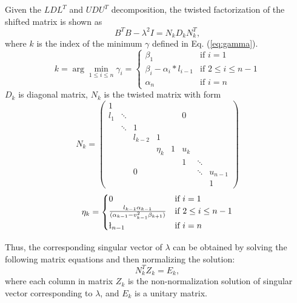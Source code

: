 Given the $LDL^T$ and $UDU^T$ decomposition, the twisted factorization of the shifted matrix is shown as
\begin{equation}
B^T B - \lambda^2 I = N_k D_k N_k^T ,
\label{eq:twisted}
\end{equation}
where $k$ is the index of the minimum $\gamma$ defined in Eq. (\ref{eq:gamma}).
\begin{equation}
\label{eq:gamma}
k = \arg \min_{1\le i \le n} \gamma_{i} =
\begin{cases}
\beta_1 & \text{if } i=1 \\
\beta_i - \alpha_i * l_{i-1} & \text{if } 2\le i\le n-1\\
\alpha_n & \text{if } i=n
\end{cases}
\end{equation}
$D_k$ is diagonal matrix, $N_k$ is the twisted matrix with form 
\begin{equation}
N_k =  \left( \begin{array}{cccccccc}
 1& & & & & & & \\
 l_{1}& \ddots& & & & 0& & \\
 & \ddots& 1& & & & &  \\
 & & l_{k-2}& 1 & & & & \\
 & & & \eta_k& 1& u_k& & \\
 & & & & & 1& \ddots& \\
 & & 0& & & & \ddots& u_{n-1}\\
 & & & & & & & 1 \end{array} \right)
\end{equation}
\begin{equation}
\eta_k = \begin{cases}
0 & \text{if } i=1 \\
\frac{l_{k-1}\alpha_{k-1}}{(\alpha_{k-1} - v_{k-1}^2 \beta_{k+1})} & \text{if } 2\le i\le n-1\\
\l_{n-1} & \text{if } i=n
\end{cases}
\end{equation}

Thus, the corresponding singular vector of $\lambda$ can be obtained by solving the following matrix equations and then normalizing the solution:
\begin{equation}
\label{eq:unnorm}
N_k^T Z_k = E_k ,
\end{equation}
 where each column in matrix $Z_k$ is the non-normalization solution of singular vector corresponding to $\lambda$, and $E_k$ is a unitary matrix.


